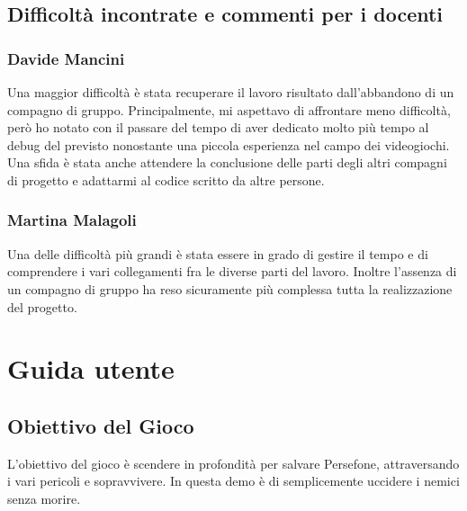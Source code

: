 \documentclass[a4paper,12pt]{report}
\begin{document}
\section{Difficoltà incontrate e commenti per i docenti}

\subsection{Davide Mancini}

Una maggior difficoltà è stata recuperare il lavoro risultato dall'abbandono di un compagno di gruppo. Principalmente, mi aspettavo di affrontare meno difficoltà, però ho notato con il passare del tempo di aver dedicato molto più tempo al debug del previsto nonostante una piccola esperienza nel campo dei videogiochi. Una sfida è stata anche attendere la conclusione delle parti degli altri compagni di progetto e adattarmi al codice scritto da altre persone.

\subsection{Martina Malagoli}

Una delle difficoltà più grandi è stata essere in grado di gestire il tempo e di comprendere i vari collegamenti fra le diverse parti del lavoro.
Inoltre l'assenza di un compagno di gruppo ha reso sicuramente più complessa tutta la realizzazione del progetto.

\appendix
\chapter{Guida utente}

\section{Obiettivo del Gioco}
L'obiettivo del gioco è scendere in profondità per salvare Persefone, attraversando i vari pericoli e sopravvivere. In questa demo è di semplicemente uccidere i nemici senza morire. 
\end{document}
